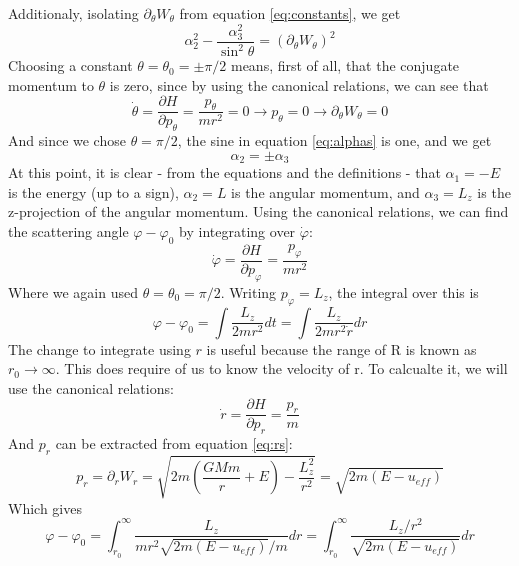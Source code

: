 \documentclass{article}
\begin{document}
Additionaly, isolating $\partial_\theta W_\theta$ from equation \ref{eq:constants}, we get
\begin{equation}
\label{eq:alphas}
    \alpha_2^2 - \frac{\alpha_3^2}{\sin^2\theta} = \left(\partial_\theta W_\theta\right)^2
\end{equation}
Choosing a constant $\theta = \theta_0 = \pm\pi/2$ means, first of all, that the conjugate momentum to $\theta$ is zero, since by using the canonical relations, we can see that
\begin{equation}
    \dot{\theta} = \frac{\partial H}{\partial p_\theta} = \frac{p_\theta}{mr^2} = 0 \rightarrow p_\theta = 0 \rightarrow \partial_\theta W_\theta = 0
\end{equation}
And since we chose $\theta = \pi/2$, the sine in equation \ref{eq:alphas} is one, and we get
\begin{equation}
    \alpha_2 = \pm \alpha_3
\end{equation}
At this point, it is clear - from the equations and the definitions - that $\alpha_1 = -E$ is the energy (up to a sign), $\alpha_2 = L$ is the angular momentum, and $\alpha_3 = L_z$ is the z-projection of the angular momentum.
\newline
Using the canonical relations, we can find the scattering angle $\varphi - \varphi_0$ by integrating over $\dot{\varphi}$:
\begin{equation}
    \dot{\varphi} = \frac{\partial H}{\partial p_\varphi} = \frac{p_\varphi}{mr^2}
\end{equation}
Where we again used $\theta = \theta_0 = \pi/2$. Writing $p_\varphi = L_z$, the integral over this is
\begin{equation}
    \varphi - \varphi_0 = \int \frac{L_z}{2mr^2} dt =\int \frac{L_z}{2mr^2 \dot{r}} dr
\end{equation}
The change to integrate using $r$ is useful because the range of R is known as $r_0 \rightarrow \infty$. This does require of us to know the velocity of r. To calcualte it, we will use the canonical relations:
\begin{equation}
    \dot{r} = \frac{\partial H}{\partial p_r} = \frac{p_r}{m}
\end{equation}
And $p_r$ can be extracted from equation \ref{eq:rs}:
\begin{equation}
    p_r = \partial_r W_r = \sqrt{2m\left(\frac{GMm}{r} + E\right)-\frac{L_z^2}{r^2}} = \sqrt{2m(E - u_{eff})}
\end{equation}
Which gives
\begin{equation}
\label{eq:phi_integral}
    \varphi - \varphi_0 = \int_{r_0}^\infty \frac{L_z}{mr^2 \sqrt{2m(E - u_{eff})} / m} dr = \int_{r_0}^\infty \frac{L_z / r^2}{\sqrt{2m(E - u_{eff})}} dr
\end{equation}
\end{document}
